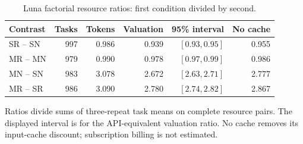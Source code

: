 \begin{table}[t]\centering
\caption{Luna factorial resource ratios: first condition divided by second.}
\label{tab:scale-resources}
\begin{tabular}{lrrrrr}\toprule
Contrast & Tasks & Tokens & Valuation & 95\% interval & No cache\\\midrule
SR -- SN & 997 & 0.986 & 0.939 & $[0.93, 0.95]$ & 0.955\\
MR -- MN & 979 & 0.990 & 0.978 & $[0.97, 0.99]$ & 0.986\\
MN -- SN & 983 & 3.078 & 2.672 & $[2.63, 2.71]$ & 2.777\\
MR -- SR & 986 & 3.090 & 2.780 & $[2.74, 2.82]$ & 2.867\\
\bottomrule\end{tabular}
\par\smallskip\noindent Ratios divide sums of three-repeat task means on complete resource pairs. The displayed interval is for the API-equivalent valuation ratio. No cache removes its input-cache discount; subscription billing is not estimated.
\end{table}
